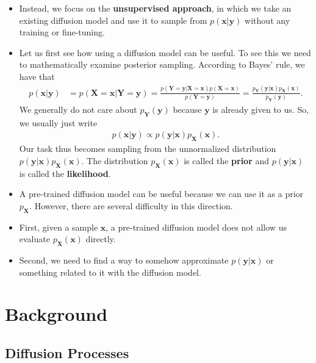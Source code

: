 \documentclass[10pt]{article}
\newcommand{\ve}[1]{\mathbf{#1}}
\begin{document}
\begin{itemize}
  \item Instead, we focus on the \textbf{unsupervised approach}, in which we take an existing diffusion model and use it to sample from $p(\ve{x}|\ve{y})$ without any training or fine-tuning.
  
  \item Let us first see how using a diffusion model can be useful. To see this we need to mathematically examine posterior sampling. According to Bayes' rule, we have that
  \begin{align*}
    p(\ve{x}|\ve{y}) 
    &= p(\ve{X} = \ve{x}| \ve{Y} = \ve{y}) 
    = \frac{p(\ve{Y} = \ve{y}|\ve{X} = \ve{x})p(\ve{X} = \ve{x})}{p(\ve{Y} = \ve{y})} 
    = \frac{p_{\ve{Y}}(\ve{y}|\ve{x})p_{\ve{X}}(\ve{x})}{p_{\ve{Y}}(\ve{y})}.
  \end{align*}
  We generally do not care about $p_{\ve{Y}}(\ve{y})$ because $\ve{y}$ is already given to us. So, we usually just write
  \begin{align*}
    p(\ve{x}|\ve{y}) \propto p(\ve{y}|\ve{x}) p_{\ve{X}}(\ve{x}).
  \end{align*}
  Our task thus becomes sampling from the unnormalized distribution $p(\ve{y}|\ve{x}) p_{\ve{X}}(\ve{x})$.
  The distribution $p_{\ve{X}}(\ve{x})$ is called the \textbf{prior} and $p(\ve{y}|\ve{x})$ is called the \textbf{likelihood}.

  \item A pre-trained diffusion model can be useful because we can use it as a prior $p_{\ve{X}}$. However, there are several difficulty in this direction.
  
  \item First, given a sample $\ve{x}$, a pre-trained diffusion model does not allow us evaluate $p_{\ve{X}}(\ve{x})$ directly.
  
  \item Second, we need to find a way to somehow approximate $p(\ve{y}|\ve{x})$ or something related to it with the diffusion model.
\end{itemize}

\section{Background}

\subsection{Diffusion Processes}
\end{document}
